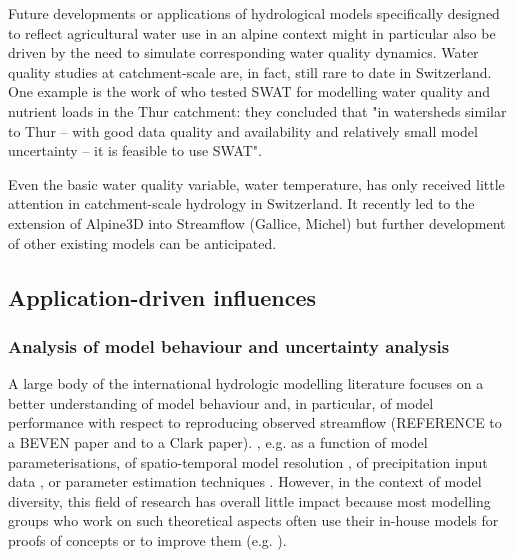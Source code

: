 \documentclass[10pt,a4paper]{article}
\begin{document}
Future developments or applications of hydrological models specifically designed to reflect agricultural water use in an alpine context might in particular also be driven by the need to simulate corresponding water quality dynamics. Water quality studies at catchment-scale are, in fact, still rare to date in Switzerland.  
One example is the work of \citep{Abbaspour2007} who tested SWAT for modelling water quality and nutrient loads in the Thur catchment: they concluded that "in watersheds similar to Thur – with good data quality and availability and relatively small model uncertainty – it is feasible to use SWAT".  

Even the basic water quality variable, water temperature, has only received little attention in catchment-scale hydrology in Switzerland. It recently led to the extension of Alpine3D into Streamflow (Gallice, Michel) but further development of other existing models can be anticipated.





\subsection{Application-driven influences}
\label{sec:context:application}


\subsubsection{Analysis of model behaviour and uncertainty analysis}
\label{sec:context:uncertainty}

A large body of the international hydrologic modelling literature focuses on a better understanding of model behaviour and, in particular, of model performance with respect to reproducing observed streamflow (REFERENCE to a BEVEN paper and to a Clark paper). 
, e.g. as a function of model parameterisations, of spatio-temporal model resolution \citep{Brunner2019}, of precipitation input data \citep{Sikorska2016, Sikorska2017, MullerThomy2019}, or parameter estimation techniques \citep{Foglia2009, Cullmann2011}. However, in the context of model diversity, this field of research has overall little impact because most modelling groups who work on such theoretical aspects often use their in-house models for proofs of concepts or to improve them (e.g. \citealt{Schaefli2007, Hingray2010}).
\end{document}
